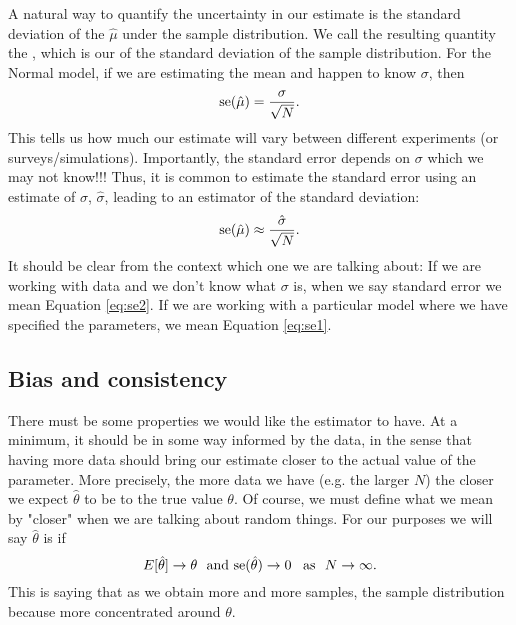  A natural way to quantify the uncertainty in our estimate is the standard deviation of the $\hat{\mu}$ under the sample distribution.  We call the resulting quantity the , which is our  of the standard deviation of the sample distribution.  For the Normal model, if we are estimating the mean and happen to know $\sigma$, then 
\begin{equation}\label{eq:se1}
{\rm se}(\hat{\mu}) =  \frac{\sigma}{\sqrt{N}}. 
\end{equation}
This tells us how much our estimate will vary between different experiments (or surveys/simulations). 
Importantly, the standard error depends on $\sigma$ which we may not know!!! Thus, it is common to estimate the standard error using an estimate of $\sigma$, $\hat{\sigma}$, leading to an estimator of the standard deviation:
\begin{equation}\label{eq:se2}
{\rm se}(\hat{\mu}) \approx  \frac{\hat{\sigma}}{\sqrt{N}}. 
\end{equation}
It should be clear from the context which one we are talking about: If we are working with data and we don't know what $\sigma$ is, when we say standard error we mean Equation \ref{eq:se2}. If we are working with a particular model where we have specified the parameters, we mean Equation \ref{eq:se1}. 







\subsection{Bias and consistency}

 There must be some properties we would like the estimator to have. At a minimum, it should be in some way informed by the data, in the sense that having more data should bring our estimate closer to the actual value of the parameter. More precisely, the more data we have (e.g. the larger $N$) the closer we expect $\hat{\theta}$ to be to the true value $\theta$. Of course, we must define what we mean by "closer" when we are talking about random things. 
For our purposes we will say $\hat{\theta}$ is  if 
\begin{equation*}
E[\hat{\theta}] \to \theta\,\,\text{ and } {\rm se}(\hat{\theta})  \to 0 \,\,\,\text{ as }\,\, N\to \infty. 
\end{equation*}
This is saying that as we obtain more and more samples, the sample distribution because more concentrated around $\theta$. 


